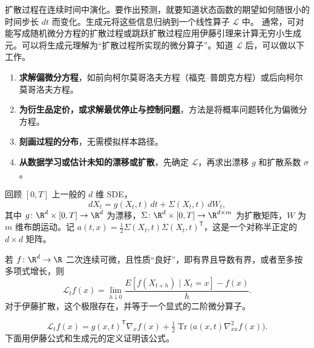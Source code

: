 

扩散过程在连续时间中演化。要作出预测，就要知道状态函数的期望如何随很小的时间步长 $dt$ 而变化。生成元将这些信息归纳到一个线性算子 $\mathcal L$ 中。
通常，可对能写成随机微分方程的扩散过程或跳跃扩散过程应用伊藤引理来计算无穷小生成元。可以将生成元理解为“扩散过程所实现的微分算子”。知道 $\mathcal L$ 后，可以做以下工作。
\begin{enumerate}
  \item \textbf{求解偏微分方程}，如前向柯尔莫哥洛夫方程（福克–普朗克方程）或后向柯尔莫哥洛夫方程。
  \item \textbf{为衍生品定价，或求解最优停止与控制问题}，方法是将概率问题转化为偏微分方程。
  \item \textbf{刻画过程的分布}，无需模拟样本路径。
  \item \textbf{从数据学习或估计未知的漂移或扩散}，先确定 $\mathcal L$，再求出漂移 $g$ 和扩散系数 $\sigma$。
\end{enumerate}


回顾 $[0,T]$ 上一般的 $d$ 维 SDE，
\begin{equation*}
  dX_t=g(X_t,t)\,dt+\Sigma(X_t,t)\,dW_t,
  \tag{6L1}\label{eq:6L1}
\end{equation*}
其中 $g\colon\R^d\times[0,T]\to\R^d$ 为漂移，$\Sigma\colon\R^d\times[0,T]\to\R^{d\times m}$ 为扩散矩阵，$W$ 为 $m$ 维布朗运动。记 $a(t,x)=\tfrac12\Sigma(X_t,t)\Sigma(X_t,t)^{\mathsf T}$，这是一个对称半正定的 $d\times d$ 矩阵。



若 $f\colon\R^d\to\R$ 二次连续可微，且性质“良好”，即有界且导数有界，或者至多按多项式增长，则
\[
  \mathcal L_t f(x)=\lim_{h\downarrow0}
           \frac{E[f(X_{t+h})\mid X_t=x]-f(x)}{h}.
\]
对于伊藤扩散，这个极限存在，并等于一个显式的二阶微分算子。


\[
  \mathcal L_t f(x)=g(x,t)^{\mathsf T}\nabla_xf(x)
      +\tfrac12\operatorname{Tr}\bigl(a(x,t)\nabla_{xx}^2f(x)\bigr).
\]
下面用伊藤公式和生成元的定义证明该公式。


